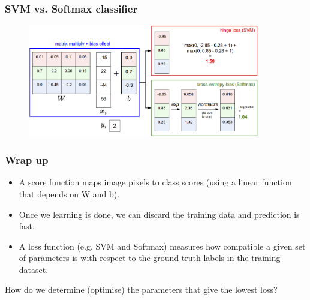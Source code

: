 \begin{frame}
	\frametitle{SVM vs. Softmax classifier}

	\centering
        \begin{figure}
                \includegraphics[width=0.9\textwidth]{Pics/svmvssoftmax.png}
        \end{figure}

\end{frame}

\begin{frame}
	\frametitle{Wrap up}

	\begin{itemize}
		\item A score function maps image pixels to class scores (using
		 a linear function that depends on W and b).
		\item Once we learning is done, we can discard the training data
		and prediction is fast.
		\item A loss function (e.g. SVM and Softmax) measures how 
		compatible a given set of parameters is with respect to the 
		ground truth labels in the training dataset. 
	\end{itemize}

	How do we determine (optimise) the parameters that give the lowest loss?

\end{frame}



